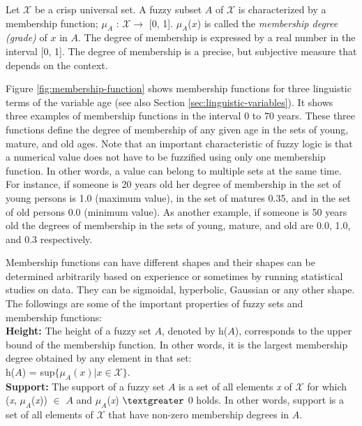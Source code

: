 \documentclass[11pt]{article}
\begin{document}
Let $\mathcal{X}$ be a crisp universal set. A fuzzy subset $\textit{A}$ of
$\mathcal{X}$ is characterized by a membership function; $\mu_A$ : $\mathcal{X}
\rightarrow$ [0, 1]. $\mu_A$($\textit{x}$) is called the \textit{membership
degree (grade)} of $\textit{x}$ in $\textit{A}$. The degree of membership is
expressed by a real number in the interval [0, 1]. The degree of membership is a
precise, but subjective measure that depends on the context.

Figure \ref{fig:membership-function} shows membership functions for three
linguistic terms of the variable age (see also Section
\ref{sec:linguistic-variables}). It shows three examples of membership functions
in the interval 0 to 70 years. These three functions define the degree of
membership of any given age in the sets of young, mature, and old ages. Note
that an important characteristic of fuzzy logic is that a numerical value does
not have to be fuzzified using only one membership function. In other words, a
value can belong to multiple sets at the same time. For instance, if someone is
20 years old her degree of membership in the set of young persons is 1.0
(maximum value), in the set of matures 0.35, and in the set of old persons 0.0
(minimum value). As another example, if someone is 50 years old the degrees of
membership in the sets of young, mature, and old are 0.0, 1.0, and 0.3
respectively.

Membership functions can have different shapes and their shapes can be
determined arbitrarily based on experience or sometimes by running statistical
studies on data. They can be sigmoidal, hyperbolic, Gaussian or any other
shape. The followings are some of the important properties of fuzzy sets and
membership functions:\\

\textbf{Height:} The height of a fuzzy set $\textit{A}$, denoted by
$\textit{h}$($\textit{A}$), corresponds to the upper bound of the membership
function. In other words, it is the largest membership degree obtained by any
element in that set:\\

$\textit{h}$($\textit{A}$) = sup$\{\mu_A(\textit{x}) | \textit{x} \in
\mathcal{X}\}$.\\

\textbf{Support:} The support of a fuzzy set $\textit{A}$ is a set of all
elements \textit{x} of $\mathcal{X}$ for which (\textit{x}, $\mu_A$(\textit{x}))
$\in$ $\textit{A}$ and $\mu_A$(\textit{x}) $\textgreater$ 0 holds. In other
words, support is a set of all elements of $\mathcal{X}$ that have non-zero
membership degrees in $\textit{A}$.\\
\end{document}
